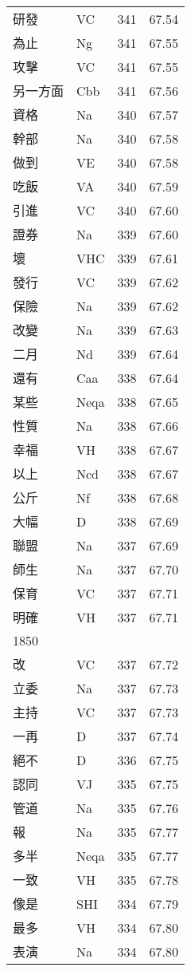 \documentclass[twocolumn]{book}
\begin{document}
\begin{supertabular}{llrr}
研發 & VC & 341 &  67.54\\
為止 & Ng & 341 &  67.55\\
攻擊 & VC & 341 &  67.55\\
另一方面 & Cbb & 341 &  67.56\\
資格 & Na & 340 &  67.57\\
幹部 & Na & 340 &  67.58\\
做到 & VE & 340 &  67.58\\
吃飯 & VA & 340 &  67.59\\
引進 & VC & 340 &  67.60\\
證券 & Na & 339 &  67.60\\
壞 & VHC & 339 &  67.61\\
發行 & VC & 339 &  67.62\\
保險 & Na & 339 &  67.62\\
改變 & Na & 339 &  67.63\\
二月 & Nd & 339 &  67.64\\
還有 & Caa & 338 &  67.64\\
某些 & Neqa & 338 &  67.65\\
性質 & Na & 338 &  67.66\\
幸福 & VH & 338 &  67.67\\
以上 & Ncd & 338 &  67.67\\
公斤 & Nf & 338 &  67.68\\
大幅 & D & 338 &  67.69\\
聯盟 & Na & 337 &  67.69\\
師生 & Na & 337 &  67.70\\
保育 & VC & 337 &  67.71\\
明確 & VH & 337 &  67.71\\
1850\\
改 & VC & 337 &  67.72\\
立委 & Na & 337 &  67.73\\
主持 & VC & 337 &  67.73\\
一再 & D & 337 &  67.74\\
絕不 & D & 336 &  67.75\\
認同 & VJ & 335 &  67.75\\
管道 & Na & 335 &  67.76\\
報 & Na & 335 &  67.77\\
多半 & Neqa & 335 &  67.77\\
一致 & VH & 335 &  67.78\\
像是 & SHI & 334 &  67.79\\
最多 & VH & 334 &  67.80\\
表演 & Na & 334 &  67.80\\

\end{supertabular}
\end{document}
